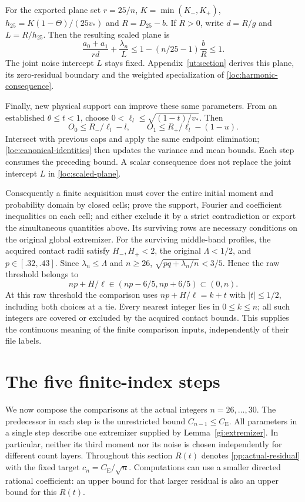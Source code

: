 \documentclass[aop,preprint]{imsart}
\theoremstyle{definition}
\newcommand{\CE}{C_{\mathrm E}}
\numberwithin{equation}{section}
\begin{document}
For the exported plane set $r=25/n$, $K=\min(K_-,K_+)$,
$h_{25}=K(1-\Theta)/(25v_*)$ and $R=D_{25}-b$.
If $R>0$, write $d=R/g$ and $L=R/h_{25}$. Then
the resulting scaled plane is
\begin{equation}\label{loc:scaled-plane}
 \frac{a_0+a_1}{rd}+\frac{\lambda_n}{L}
 \le1-(n/25-1)\frac bR\le1.
\end{equation}
The joint noise intercept $L$ stays fixed. Appendix~\ref{ut:section}
derives this plane, its zero-residual boundary and the weighted
specialization of \eqref{loc:harmonic-consequence}.

Finally, new physical support can improve these same parameters.
From an established $\theta\le t<1$, choose
$0<\ell_l\le\sqrt{(1-t)/v_*}$. Then
\[
 O_0\le R_-/\ell_l-l,\qquad
 O_1\le R_+/\ell_l-(1-u).
\]
Intersect with previous caps and apply the same endpoint elimination;
\eqref{loc:canonical-identities} then updates the variance and mean
bounds. Each step consumes the preceding bound. A scalar consequence
does not replace the joint intercept $L$ in \eqref{loc:scaled-plane}.

Consequently a finite acquisition must cover the entire initial moment
and probability domain by closed cells; prove the support, Fourier and
coefficient inequalities on each cell; and either exclude it by a strict
contradiction or export the simultaneous quantities above. Its surviving
rows are necessary conditions on the original global extremizer.
For the surviving middle-band profiles, the acquired contact radii
satisfy $H_-,H_+<2$, the original $\Lambda<1/2$, and
$p\in[.32,.43]$. Since $\lambda_n\le\Lambda$ and $n\ge26$,
$\sqrt{pq+\lambda_n/n}<3/5$. Hence the raw threshold belongs to
\[
 np+H/\ell\in(np-6/5,np+6/5)\subset(0,n).
\]
At this raw threshold the comparison uses
$np+H/\ell=k+t$ with $|t|\le1/2$, including both choices at a tie.
Every nearest integer lies in $0\le k\le n$; all such integers are
covered or excluded by the acquired contact bounds.
This supplies the continuous meaning of the finite
comparison inputs, independently of their file labels.


\section{The five finite-index steps}\label{fc:section}

We now compose the comparisons at the actual integers
$n=26,\ldots,30$. The predecessor in each step is the unrestricted
bound $C_{n-1}\le\CE$. All parameters in a single step describe
one extremizer supplied by Lemma~\ref{gi:extremizer}.
In particular, neither its third moment nor its noise is chosen
independently for different count layers.
Throughout this section $R(t)$ denotes \eqref{pp:actual-residual}
with the fixed target $c_n=\CE/\sqrt n$. Computations can use
a smaller directed rational coefficient: an upper bound for that
larger residual is also an upper bound for this $R(t)$.
\end{document}
